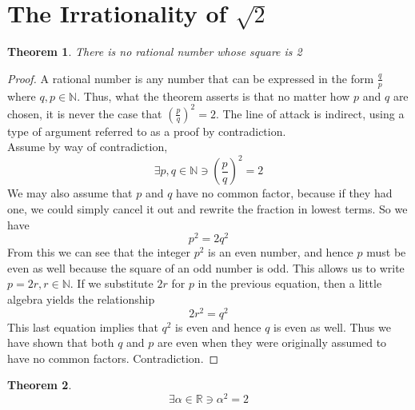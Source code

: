 \documentclass[10pt]{report}
\newtheorem{thm3}{Theorem}[subsection]
\begin{document}
\section{The Irrationality of $\sqrt{2}$}
\begin{thm3}There is no rational number whose square is 2
\end{thm3}
\begin{proof}
A rational number is any number that can be expressed in the form $\frac{q}{p}$ where $q,p\in\mathbb{N}$. Thus, what the theorem asserts is that no matter how $p$ and $q$ are chosen, it is never the case that $\left(\frac{p}{q}\right)^2 =2$. The line of attack is indirect, using a type of argument referred to as a proof by contradiction.\\
Assume by way of contradiction, 
$$\exists p,q\in\mathbb{N}\ni \left( \frac{p}{q} \right)^2 =2$$
We may also assume that $p$ and $q$ have no common factor, because if they had one, we could simply cancel it out and rewrite the fraction in lowest terms. So we have
$$p^2=2q^2$$
From this we can see that the integer $p^2$ is an even number, and hence $p$ must be even as well because the square of an odd number is odd. This allows us to write $p=2r,r\in\mathbb{N}$. If we substitute $2r$ for $p$ in the previous equation, then a little algebra yields the relationship
$$2r^2=q^2$$
This last equation implies that $q^2$ is even and hence $q$ is even as well. Thus we have shown that both $q$ and $p$ are even when they were originally assumed to have no common factors. Contradiction.
\end{proof}
\begin{thm3}
$$\exists\alpha\in\mathbb{R}\ni\alpha^2=2$$
\end{thm3}
\end{document}
